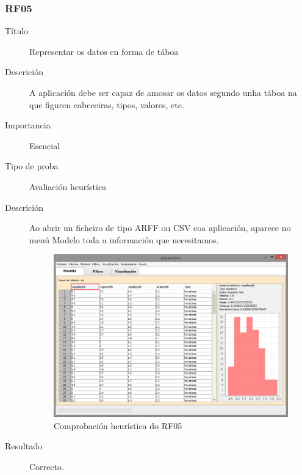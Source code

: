 \subsubsection*{RF05}
\begin{description}
\item[Título] \hfill
Representar os datos en forma de táboa
\item[Descrición] \hfill
A aplicación debe ser capaz de amosar os datos segundo unha táboa na que figuren cabeceiras, tipos, valores, etc.
\item[Importancia] \hfill
Esencial
\item[Tipo de proba] \hfill
Avaliación heurística
\item[Descrición]
Ao abrir un ficheiro de tipo ARFF ou CSV coa aplicación, aparece no menú Modelo toda a información que necesitamos.
\begin{figure}
\centering
\includegraphics[width=\textwidth,height=\textheight,keepaspectratio]{figuras/RF05}
\caption{Comprobación heurística do RF05}
\label{RF05}
\end{figure}
\item[Resultado]
Correcto.
\end{description}

